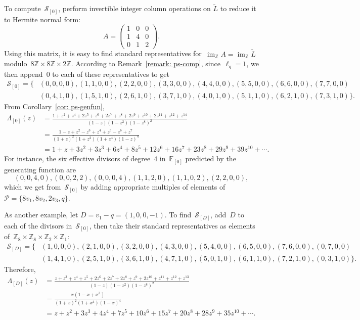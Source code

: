 \documentclass{amsart}
\DeclareMathOperator{\im}{im}
\newcommand{\primary}{\mathcal{P}}
\newcommand{\secondary}{\mathcal{S}}
\newcommand{\Z}{\mathbb{Z}}
\newcommand{\E}{\mathbb{E}}
\newcommand{\tL}{\tilde{L}}
\newcommand{\tl}{\ell}
\begin{document}
To compute~$\secondary_{[0]}$, perform invertible integer column operations on $\tL$ to reduce it to Hermite normal form:
\[
  A =
\left(\begin{array}{rrr}
1 & 0 & 0 \\
1 & 4 & 0 \\
0 & 1 & 2
\end{array}\right).
\]
Using this matrix, it is easy to find standard representatives for~$\im_{\Z}A=\im_{\Z}\tL$ 
modulo~$8\Z\times8\Z\times2\Z$.  According to Remark~\ref{remark: ps-comp}, since~$\tl_q=1$,
we then append~$0$ to each of these representatives to get
\begin{align*}
  \secondary_{[0]}=\{ &(0,0,0,0),(1,1,0,0),(2,2,0,0),(3,3,0,0),(4,4,0,0),(5,5,0,0),(6,6,0,0),(7,7,0,0)\\[8pt]
  &(0,4,1,0),(1,5,1,0),(2,6,1,0),(3,7,1,0),(4,0,1,0),(5,1,1,0),(6,2,1,0),(7,3,1,0)\}.
\end{align*}
From Corollary~\ref{cor: ps-genfun},
\begin{align*}
\Lambda_{[0]}(z)&=\frac{1+z^2+z^4+2z^5+z^6+2z^7+z^8+2z^9+z^{10}+2z^{11}+z^{12}+z^{14}}{(1-z)(1-z^2)(1-z^8)^2}\\[5pt]
&=\frac{1-z+z^2-z^3+z^4+z^5-z^6+z^7}{(1+z)^2(1+z^2)(1+z^4)(1-z)^4}\\[8pt]
&=1 + z + 3 z^{2} + 3 z^{3} + 6 z^{4} + 8 z^{5} + 12 z^{6} + 16 z^{7} + 23 z^{8}
+ 29 z^{9} + 39 z^{10} +\cdots.
\end{align*}
For instance, the six effective divisors of degree~$4$ in~$\E_{[0]}$ predicted by
the generating function are
\[
  (0,0,4,0),(0,0,2,2),(0,0,0,4),(1,1,2,0),(1,1,0,2),(2,2,0,0),
\]
which we get from~$\secondary_{[0]}$ by adding appropriate multiples of elements
of~$\primary=\{8v_1,8v_2,2v_3,q\}$.

As another example, let $D=v_1-q=(1,0,0,-1)$.  To find~$\secondary_{[D]}$, 
add~$D$ to each of the divisors in~$\secondary_{[0]}$, then take their standard
representatives as elements of~$\Z_8\times\Z_8\times\Z_2\times\Z_1$:
\begin{align*}
  \secondary_{[D]}= \{ &(1,0,0,0),(2,1,0,0),(3,2,0,0),(4,3,0,0),
    (5,4,0,0),(6,5,0,0),(7,6,0,0),(0,7,0,0)\\[8pt]
&(1,4,1,0),(2,5,1,0),(3,6,1,0),(4,7,1,0),
(5,0,1,0),(6,1,1,0),(7,2,1,0),(0,3,1,0)\}.
\end{align*}
Therefore,
\begin{align*}
\Lambda_{[D]}(z)&=\frac{z+z^3+z^4+z^5+2z^6+2z^7+2z^8+z^9+2z^{10}+z^{11}+z^{12}+z^{13}}{(1-z)(1-z^2)(1-z^8)^2}\\[5pt]
&=\frac{x(1-x+x^3)}{(1+x)^2(1+x^4)(1-x)^4}\\[8pt]
&= z + z^{2} + 3 z^{3} + 4 z^{4} + 7 z^{5} + 10 z^{6} + 15 z^{7} + 20 z^{8} + 28
z^{9} + 35 z^{10}+\cdots.
\end{align*}
\end{document}
